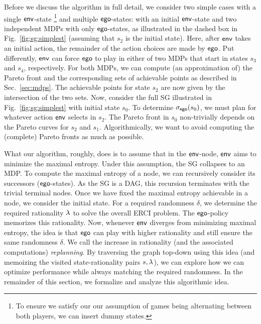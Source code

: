 Before we discuss the algorithm in full detail, we consider two simple cases with a single $\mathsf{env}$-state \footnote{To ensure we satisfy our our assumption of games being alternating between both players, we can insert dummy states.} and multiple $\mathsf{ego}$-states: with an initial $\mathsf{env}$-state and two independent MDPs with only $\mathsf{ego}$-states, as illustrated in the dashed box in Fig.~\ref{fig:sg:simplest} (assuming that $s_2$ is the initial state).
Here, after $\mathsf{env}$ takes an initial action, the remainder of the action choices are made by $\mathsf{ego}$. Put differently, $\mathsf{env}$ can force $\mathsf{ego}$ to play in either of two MDPs that start in states $s_3$ and $s_4$, respectively.
For both MDPs, we can compute (an approximation of) the Pareto front and the corresponding sets of achievable points as described in Sec.~\ref{sec:mdps}. 
The achievable points for state $s_2$ are now given by the intersection of the two sets.
Now, consider the full SG illustrated in Fig.~\ref{fig:sg:simplest} with initial state $s_0$. 
To determine ${\sigma_{\mathsf{ego}}}(s_0)$, we must plan for whatever action $\mathsf{env}$ selects in $s_2$. The Pareto front in $s_0$ non-trivially depends on the Pareto curves for $s_2$ and $s_1$. Algorithmically, we want to avoid computing the (complete) Pareto fronts as much as possible.
 
What our algorithm, roughly, does is to assume that in the $\mathsf{env}$-node, $\mathsf{env}$ aims to minimize the maximal entropy. Under this assumption, the SG collapses to an MDP. To compute the maximal entropy of a node, we can recursively consider its successors ($\mathsf{ego}$-states). As the SG is a DAG, this recursion terminates with the trivial terminal nodes. Once we have fixed the maximal entropy achievable in a node, we consider the initial state. For a required randomness $\delta$, we determine the required rationality $\lambda$ to solve the overall ERCI problem. The $\mathsf{ego}$-policy memorizes this rationality. Now, whenever $\mathsf{env}$ diverges from minimizing maximal entropy, the idea is that $\mathsf{ego}$ can play with higher rationality and still ensure the same randomness $\delta$. We call the increase in rationality (and the associated computations)  \emph{replanning}.
By traversing the graph top-down using this idea (and memoizing the visited state-rationality pairs $s,\lambda$), we can explore how we can optimize performance while always matching the required randomness.  In the remainder of this section, we formalize and analyze this algorithmic idea.

